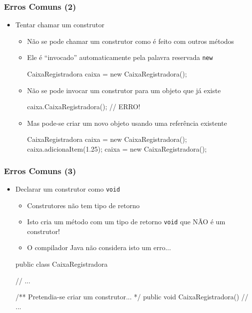\documentclass[xcolor={dvipsnames,table},aspectratio=169]{beamer}
\begin{document}
\begin{frame}[fragile]\frametitle{Erros Comuns (2)}
\begin{itemize}
	\item Tentar chamar um construtor
	\begin{itemize}
		\item Não se pode chamar um construtor como é feito com outros métodos
		\item Ele é ``invocado'' automaticamente pela palavra reservada \texttt{new}
\begin{javacode}
CaixaRegistradora caixa = new CaixaRegistradora();
\end{javacode}
		\item Não se pode invocar um construtor para um objeto que já existe
\begin{javacode}
caixa.CaixaRegistradora(); // ERRO!
\end{javacode}
		\item Mas pode-se criar um novo objeto usando uma referência existente
\begin{javacode}
CaixaRegistradora caixa = new CaixaRegistradora();
caixa.adicionaItem(1.25);
caixa = new CaixaRegistradora();
\end{javacode}
	\end{itemize}
\end{itemize}
\end{frame}

\begin{frame}[fragile]\frametitle{Erros Comuns (3)}
\begin{itemize}
	\item Declarar um construtor como \texttt{void}
	\begin{itemize}
		\item Construtores não tem tipo de retorno
		\item Isto cria um método com um tipo de retorno \texttt{void} que NÃO é um construtor!
		\item O compilador Java não considera isto um erro...
	\end{itemize}
\begin{javacode}
public class CaixaRegistradora {
  // ...

  /** Pretendia-se criar um construtor... */
  public void CaixaRegistradora() { 
    // ...
  }
}
\end{javacode}
\end{itemize}
\end{frame}
\end{document}

